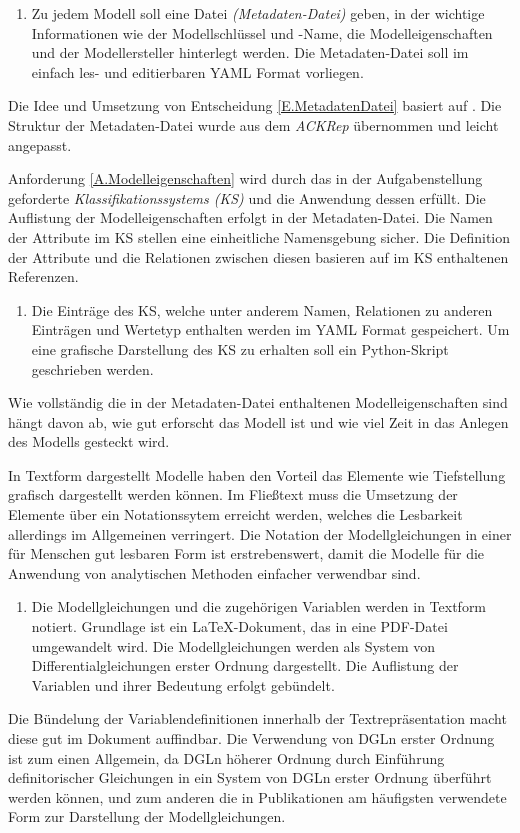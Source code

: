 \begin{enumerate}[label=\textbf{Entscheidung E.\arabic*}:, ref=\textbf{E.\arabic*}, wide=0pt, leftmargin=*]
	\item \label{E.MetadatenDatei}Zu jedem Modell soll eine Datei \textit{(Metadaten-Datei)} geben, in der wichtige Informationen wie der Modellschlüssel und -Name, die Modelleigenschaften und der Modellersteller hinterlegt werden. Die Metadaten-Datei soll im einfach les- und editierbaren YAML Format vorliegen.
\end{enumerate}
Die Idee und Umsetzung von Entscheidung \ref{E.MetadatenDatei} basiert auf \cite{KNHE20a}. Die Struktur der Metadaten-Datei wurde aus dem \textit{ACKRep} übernommen und leicht angepasst.

Anforderung \ref{A.Modelleigenschaften} wird durch das in der Aufgabenstellung geforderte \textit{Klassifikationssystems (KS)} und die Anwendung dessen erfüllt. Die Auflistung der Modelleigenschaften erfolgt in der Metadaten-Datei. Die Namen der Attribute im KS stellen eine einheitliche Namensgebung sicher. Die Definition der Attribute und die Relationen zwischen diesen basieren auf im KS enthaltenen Referenzen.
\begin{enumerate}[resume*]
	\item Die Einträge des KS, welche unter anderem Namen, Relationen zu anderen Einträgen und Wertetyp enthalten werden im YAML Format gespeichert. Um eine grafische Darstellung des KS zu erhalten soll ein Python-Skript geschrieben werden.
\end{enumerate}
Wie vollständig die in der Metadaten-Datei enthaltenen Modelleigenschaften sind hängt davon ab, wie gut erforscht das Modell ist und wie viel Zeit in das Anlegen des Modells gesteckt wird.

In Textform dargestellt Modelle haben den Vorteil das Elemente wie Tiefstellung grafisch dargestellt werden können. Im Fließtext muss die Umsetzung der Elemente über ein Notationssytem erreicht werden, welches die Lesbarkeit allerdings im Allgemeinen verringert. Die Notation der Modellgleichungen in einer für Menschen gut lesbaren Form ist erstrebenswert, damit die Modelle für die Anwendung von analytischen Methoden einfacher verwendbar sind. 
\begin{enumerate}[resume*]
	\item \label{E.Textdok}Die Modellgleichungen und die zugehörigen Variablen werden in Textform notiert. Grundlage ist ein \LaTeX-Dokument, das in eine PDF-Datei umgewandelt wird. Die Modellgleichungen werden als System von Differentialgleichungen erster Ordnung dargestellt. Die Auflistung der Variablen und ihrer Bedeutung erfolgt gebündelt.
\end{enumerate}
Die Bündelung der Variablendefinitionen innerhalb der Textrepräsentation macht diese gut im Dokument auffindbar. Die Verwendung von DGLn erster Ordnung ist zum einen Allgemein, da DGLn höherer Ordnung durch Einführung definitorischer Gleichungen in ein System von DGLn erster Ordnung überführt werden können, und zum anderen die in Publikationen am häufigsten verwendete Form zur Darstellung der Modellgleichungen.

